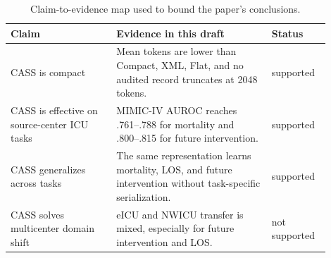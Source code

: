 \begin{table}[t]
\caption{Claim-to-evidence map used to bound the paper's conclusions.}
\label{tab:claim_evidence}
\centering
\small
\setlength{\tabcolsep}{3.2pt}
\begin{tabular}{p{0.30\linewidth}p{0.44\linewidth}p{0.16\linewidth}}
\toprule
Claim & Evidence in this draft & Status \\
\midrule
CASS is compact & Mean tokens are lower than Compact, XML, Flat, and no audited record truncates at 2048 tokens. & supported \\
CASS is effective on source-center ICU tasks & MIMIC-IV AUROC reaches .761--.788 for mortality and .800--.815 for future intervention. & supported \\
CASS generalizes across tasks & The same representation learns mortality, LOS, and future intervention without task-specific serialization. & supported \\
CASS solves multicenter domain shift & eICU and NWICU transfer is mixed, especially for future intervention and LOS. & not supported \\
\bottomrule
\end{tabular}
\end{table}

